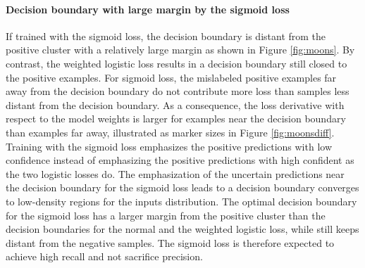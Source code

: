 \paragraph{Decision boundary with large margin by the sigmoid loss}
If trained with the sigmoid loss, the decision boundary is distant from the positive cluster with a relatively large margin as shown in Figure \ref{fig:moons}.
By contrast, the weighted logistic loss results in a decision boundary still closed to the positive examples.
For sigmoid loss, the mislabeled positive examples far away from the decision boundary do not contribute more loss than samples less distant from the decision boundary.
As a consequence, the loss derivative with respect to the model weights is larger for examples near the decision boundary than examples far away, illustrated as marker sizes in Figure \ref{fig:moonsdiff}.
Training with the sigmoid loss emphasizes the positive predictions with low confidence instead of emphasizing the positive predictions with high confident as the two logistic losses do.
The emphasization of the uncertain predictions near the decision boundary for the sigmoid loss leads to a decision boundary converges to low-density regions for the inputs distribution.
The optimal decision boundary for the sigmoid loss has a larger margin from the positive cluster than the decision boundaries for the normal and the weighted logistic loss, while still keeps distant from the negative samples.
The sigmoid loss is therefore expected to achieve high recall and not sacrifice precision.



